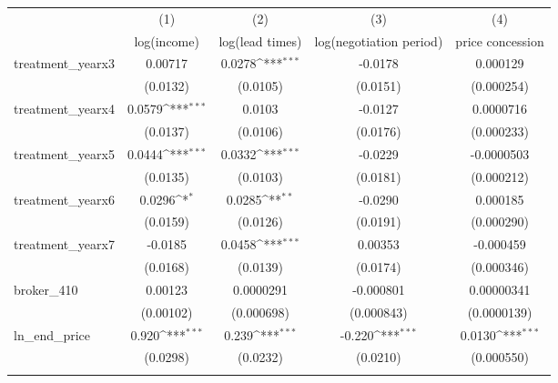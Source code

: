 {
\def\sym#1{\ifmmode^{#1}\else\(^{#1}\)\fi}
\begin{tabular}{l*{4}{c}}
\toprule
            &\multicolumn{1}{c}{(1)}&\multicolumn{1}{c}{(2)}&\multicolumn{1}{c}{(3)}&\multicolumn{1}{c}{(4)}\\
            &\multicolumn{1}{c}{log(income)}&\multicolumn{1}{c}{log(lead times)}&\multicolumn{1}{c}{log(negotiation period)}&\multicolumn{1}{c}{price concession}\\
\midrule
treatment\_yearx3&     0.00717         &      0.0278\sym{***}&     -0.0178         &    0.000129         \\
            &    (0.0132)         &    (0.0105)         &    (0.0151)         &  (0.000254)         \\
\addlinespace
treatment\_yearx4&      0.0579\sym{***}&      0.0103         &     -0.0127         &   0.0000716         \\
            &    (0.0137)         &    (0.0106)         &    (0.0176)         &  (0.000233)         \\
\addlinespace
treatment\_yearx5&      0.0444\sym{***}&      0.0332\sym{***}&     -0.0229         &  -0.0000503         \\
            &    (0.0135)         &    (0.0103)         &    (0.0181)         &  (0.000212)         \\
\addlinespace
treatment\_yearx6&      0.0296\sym{*}  &      0.0285\sym{**} &     -0.0290         &    0.000185         \\
            &    (0.0159)         &    (0.0126)         &    (0.0191)         &  (0.000290)         \\
\addlinespace
treatment\_yearx7&     -0.0185         &      0.0458\sym{***}&     0.00353         &   -0.000459         \\
            &    (0.0168)         &    (0.0139)         &    (0.0174)         &  (0.000346)         \\
\addlinespace
broker\_410  &     0.00123         &   0.0000291         &   -0.000801         &  0.00000341         \\
            &   (0.00102)         &  (0.000698)         &  (0.000843)         & (0.0000139)         \\
\addlinespace
ln\_end\_price&       0.920\sym{***}&       0.239\sym{***}&      -0.220\sym{***}&      0.0130\sym{***}\\
            &    (0.0298)         &    (0.0232)         &    (0.0210)         &  (0.000550)         \\
\addlinespace

\end{tabular}}
